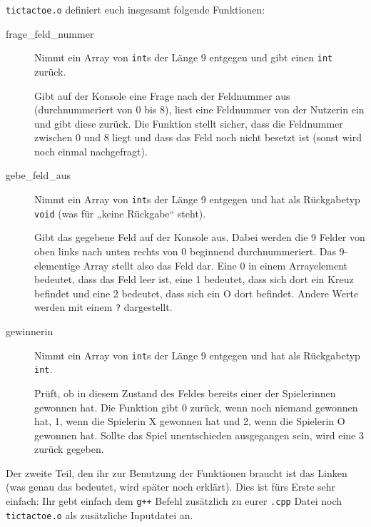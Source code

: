 \texttt{tictactoe.o} definiert euch insgesamt folgende Funktionen:
\begin{description}
    \item[frage\_feld\_nummer]
        Nimmt ein Array von \texttt{int}s der Länge 9 entgegen und gibt einen
        \texttt{int} zurück.

        Gibt auf der Konsole eine Frage nach der Feldnummer aus
        (durchnummeriert von 0 bis 8), liest eine Feldnummer von der Nutzerin
        ein und gibt diese zurück. Die Funktion stellt sicher, dass die
        Feldnummer zwischen 0 und 8 liegt und dass das Feld noch nicht besetzt
        ist (sonst wird noch einmal nachgefragt).
    \item[gebe\_feld\_aus]
        Nimmt ein Array von \texttt{int}s der Länge 9 entgegen und hat als
        Rückgabetyp \texttt{void} (was für „keine Rückgabe“ steht).

        Gibt das gegebene Feld auf der Konsole aus. Dabei werden die 9 Felder
        von oben links nach unten rechts von 0 beginnend durchnummeriert. Das
        9-elementige Array stellt also das Feld dar. Eine 0 in einem
        Arrayelement bedeutet, dass das Feld leer ist, eine 1 bedeutet, dass
        sich dort ein Kreuz befindet und eine 2 bedeutet, dass sich ein O dort
        befindet. Andere Werte werden mit einem \texttt{?} dargestellt.
    \item[gewinnerin]
        Nimmt ein Array von \texttt{int}s der Länge 9 entgegen und hat als
        Rückgabetyp \texttt{int}.

        Prüft, ob in diesem Zustand des Feldes bereits einer der Spielerinnen
        gewonnen hat. Die Funktion gibt 0 zurück, wenn noch niemand gewonnen
        hat, 1, wenn die Spielerin X gewonnen hat und 2, wenn die Spielerin O
        gewonnen hat. Sollte das Spiel unentschieden ausgegangen sein, wird
        eine 3 zurück gegeben.
\end{description}

Der zweite Teil, den ihr zur Benutzung der Funktionen braucht ist das Linken
(was genau das bedeutet, wird später noch erklärt). Dies ist fürs Erste sehr
einfach: Ihr gebt einfach dem \texttt{g++} Befehl zusätzlich zu eurer
\texttt{.cpp} Datei noch \texttt{tictactoe.o} als zusätzliche Inputdatei an.


